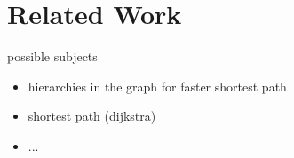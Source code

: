 \section{Related Work}\label{sec:relatedwork}

possible subjects
\begin{itemize}
    \item hierarchies in the graph for faster shortest path
    \item shortest path (dijkstra)
    \item ...
\end{itemize}
